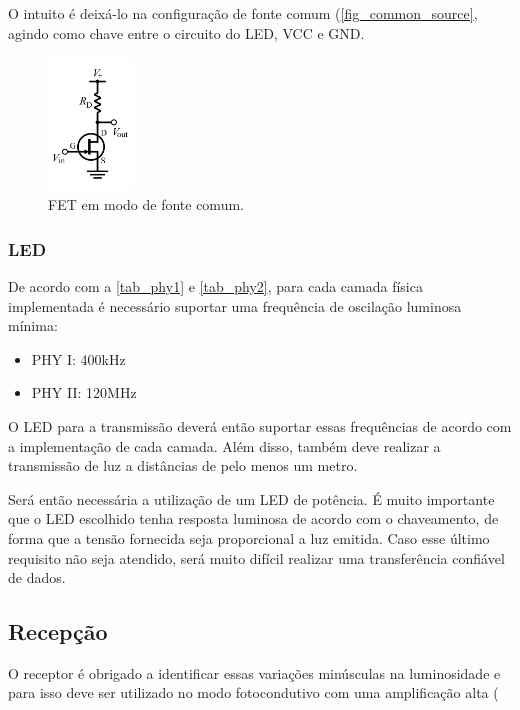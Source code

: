 	O intuito é deixá-lo na configuração de fonte comum (\autoref{fig_common_source}, agindo como chave entre o circuito do LED, VCC e GND.
		
	\begin{figure}[htb]
		\caption{\label{fig_common_source} FET em modo de fonte comum.}
		\centering
		\includegraphics[width=0.2\textwidth]{circuits/common_source.pdf}
	\end{figure}

	\subsubsection{LED}\label{hard-led}
	
	De acordo com a \autoref{tab_phy1} e \autoref{tab_phy2}, para cada camada física implementada é necessário suportar uma frequência de oscilação luminosa mínima:
	
	\begin{itemize}
		\item PHY I: 400kHz
		\item PHY II: 120MHz
	\end{itemize} 
	
	O LED para a transmissão deverá então suportar essas frequências de acordo com a implementação de cada camada. Além disso, também deve realizar a transmissão de luz a distâncias de pelo menos um metro.
	
	Será então necessária a utilização de um LED de potência. É muito importante que o LED escolhido tenha resposta luminosa de acordo com o chaveamento, de forma que a tensão fornecida seja proporcional a luz emitida. Caso esse último requisito não seja atendido, será muito difícil realizar uma transferência confiável de dados.
	
	\subsection{Recepção}
	
	O receptor é obrigado a identificar essas variações minúsculas na luminosidade e para isso deve ser utilizado no modo fotocondutivo com uma amplificação alta (
	
